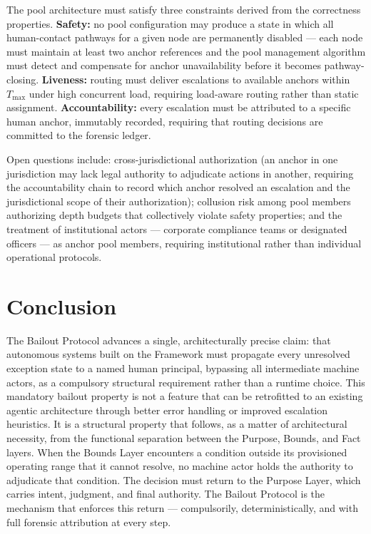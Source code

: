 The pool architecture must satisfy three constraints derived from the correctness properties. \textbf{Safety:} no pool configuration may produce a state in which all human-contact pathways for a given node are permanently disabled — each node must maintain at least two anchor references and the pool management algorithm must detect and compensate for anchor unavailability before it becomes pathway-closing. \textbf{Liveness:} routing must deliver escalations to available anchors within $T_{\max}$ under high concurrent load, requiring load-aware routing rather than static assignment. \textbf{Accountability:} every escalation must be attributed to a specific human anchor, immutably recorded, requiring that routing decisions are committed to the forensic ledger.

Open questions include: cross-jurisdictional authorization (an anchor in one jurisdiction may lack legal authority to adjudicate actions in another, requiring the accountability chain to record which anchor resolved an escalation and the jurisdictional scope of their authorization); collusion risk among pool members authorizing depth budgets that collectively violate safety properties; and the treatment of institutional actors — corporate compliance teams or designated officers — as anchor pool members, requiring institutional rather than individual operational protocols.

\section{Conclusion}
\label{sec:conclusion}

The Bailout Protocol advances a single, architecturally precise claim: that autonomous systems built on the \bxthree{} Framework must propagate every unresolved exception state to a named human principal, bypassing all intermediate machine actors, as a compulsory structural requirement rather than a runtime choice. This mandatory bailout property is not a feature that can be retrofitted to an existing agentic architecture through better error handling or improved escalation heuristics. It is a structural property that follows, as a matter of architectural necessity, from the functional separation between the Purpose, Bounds, and Fact layers. When the Bounds Layer encounters a condition outside its provisioned operating range that it cannot resolve, no machine actor holds the authority to adjudicate that condition. The decision must return to the Purpose Layer, which carries intent, judgment, and final authority. The Bailout Protocol is the mechanism that enforces this return — compulsorily, deterministically, and with full forensic attribution at every step.

